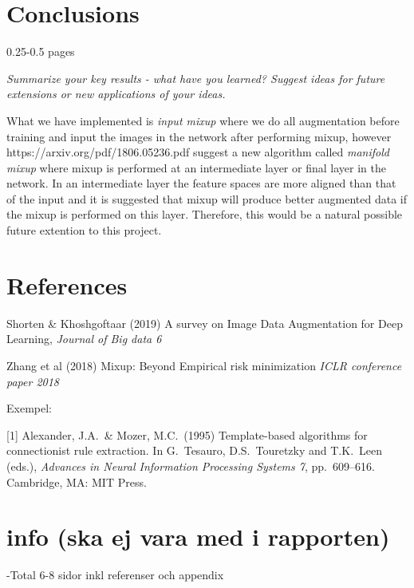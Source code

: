 \documentclass{article}
\begin{document}
\section{Conclusions}

0.25-0.5 pages

\textit{Summarize your key results - what have you learned? Suggest ideas for future extensions or new applications of your ideas.}

What we have implemented is \textit{input mixup} where we do all augmentation before training and input the images in the network after performing mixup, however https://arxiv.org/pdf/1806.05236.pdf 
suggest a new algorithm called \textit{manifold mixup} where mixup is performed at an intermediate layer or final layer in the network. In an intermediate layer 
the feature spaces are more aligned than that of the input and it is suggested that mixup will produce better augmented data if the mixup is performed on this layer. Therefore, this would be 
a natural possible future extention to this project. 


\section*{References}

Shorten \& Khoshgoftaar (2019) A survey on Image Data Augmentation for Deep Learning, \textit{Journal of Big data 6}

Zhang et al (2018) Mixup: Beyond Empirical risk minimization \textit{ICLR conference paper 2018}

Exempel:
\medskip

\small

[1] Alexander, J.A.\ \& Mozer, M.C.\ (1995) Template-based algorithms for
connectionist rule extraction. In G.\ Tesauro, D.S.\ Touretzky and T.K.\ Leen
(eds.), {\it Advances in Neural Information Processing Systems 7},
pp.\ 609--616. Cambridge, MA: MIT Press.

\section{info (ska ej vara med i rapporten)}

-Total 6-8 sidor inkl referenser och appendix
\end{document}
